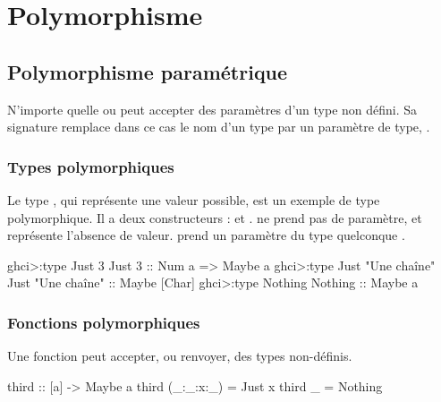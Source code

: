 \section{ Polymorphisme}
\label{polymorphism}

\subsection{Polymorphisme paramétrique}

N'importe quelle  ou   peut accepter des paramètres d'un type non défini. Sa signature remplace dans ce cas le nom d'un type par un paramètre de type, .

\subsubsection{Types polymorphiques}

Le type , qui représente une valeur possible, est un exemple de type polymorphique. Il a deux constructeurs :  et .  ne prend pas de paramètre, et représente l'absence de valeur.  prend un paramètre du type quelconque .

\begin{haskellcode}
ghci>:type Just 3
Just 3 :: Num a => Maybe a
ghci>:type Just "Une chaîne"
Just "Une chaîne" :: Maybe [Char]
ghci>:type Nothing
Nothing :: Maybe a
\end{haskellcode}

\subsubsection{Fonctions polymorphiques}

Une fonction peut accepter, ou renvoyer, des types non-définis.

\begin{haskellcode}
third :: [a] -> Maybe a
third (_:_:x:_) = Just x
third _ = Nothing
\end{haskellcode}

